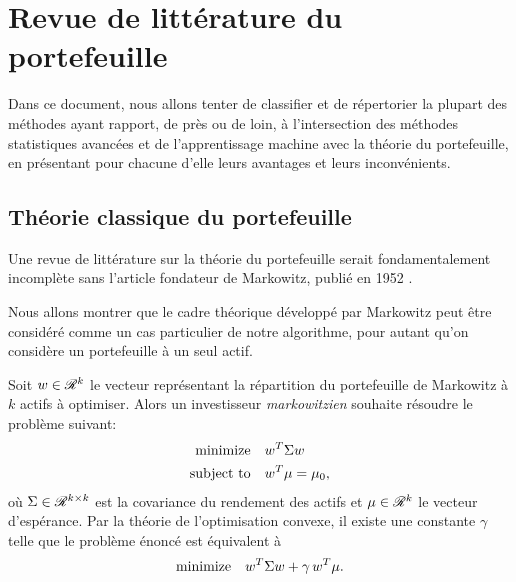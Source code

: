 \section{Revue de littérature du portefeuille}


Dans ce document, nous allons tenter de classifier et de répertorier la plupart des
méthodes ayant rapport, de près ou de loin, à l'intersection des méthodes statistiques
avancées et de l'apprentissage machine avec la théorie du portefeuille, en présentant pour
chacune d'elle leurs avantages et leurs inconvénients.

\subsection{Théorie classique du portefeuille}

Une revue de littérature sur la théorie du portefeuille serait fondamentalement incomplète
sans l'article fondateur de Markowitz, publié en 1952 \cite{markowitz1952portfolio}.

Nous allons montrer que le cadre théorique développé par Markowitz peut être considéré
comme un cas particulier de notre algorithme, pour autant qu'on considère un portefeuille
à un seul actif.

Soit $w\in\mathscr{R}^k$ le vecteur représentant la répartition du portefeuille de Markowitz à
$k$ actifs à optimiser. Alors un investisseur \textit{markowitzien} souhaite résoudre le
problème suivant:
\begin{align*}
  \minimizeEquationSt{w^T\Sigma w}[w^T\mu = \mu_0],
\end{align*}
où $\Sigma\in\mathscr{R}^{k\times k}$ est la covariance du rendement des actifs et
$\mu\in\mathscr{R}^k$ le vecteur d'espérance.   Par la théorie de
l'optimisation convexe, il existe une constante $\gamma$ telle que le problème énoncé est
équivalent à
\begin{equation*}
  \text{minimize} \quad {w^T\Sigma w + \gamma\,w^T\mu}.
\end{equation*}

